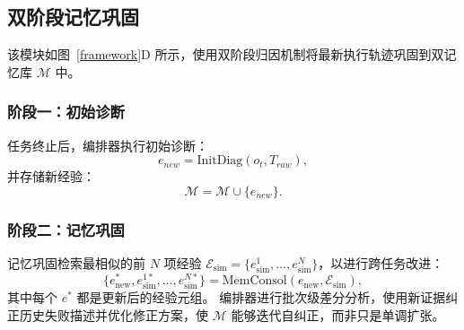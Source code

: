 \subsection{双阶段记忆巩固}
\label{Evolution}

该模块如图~\ref{framework}D 所示，使用双阶段归因机制将最新执行轨迹巩固到双记忆库 $\mathcal{M}$ 中。

\subsubsection{阶段一：初始诊断}

任务终止后，编排器执行初始诊断：
\begin{equation}
e_{new} = \text{InitDiag}(o_t, T_{raw}),
\end{equation}
并存储新经验：
\begin{equation}
\mathcal{M} = \mathcal{M} \cup \{e_{new}\}.
\end{equation}

\subsubsection{阶段二：记忆巩固}

记忆巩固检索最相似的前 $N$ 项经验 $\mathcal{E}_{\text{sim}} = \{e_{\text{sim}}^1, \dots, e_{\text{sim}}^N\}$，以进行跨任务改进：
\begin{equation}
\{e_{\text{new}}^*, e_{\text{sim}}^{1*}, \dots, e_{\text{sim}}^{N*}\} = \text{MemConsol}(e_{\text{new}}, \mathcal{E}_{\text{sim}}),
\end{equation}
其中每个 $e^*$ 都是更新后的经验元组。
编排器进行批次级差分分析，使用新证据纠正历史失败描述并优化修正方案，使 $\mathcal{M}$ 能够迭代自纠正，而非只是单调扩张。

\endinput
